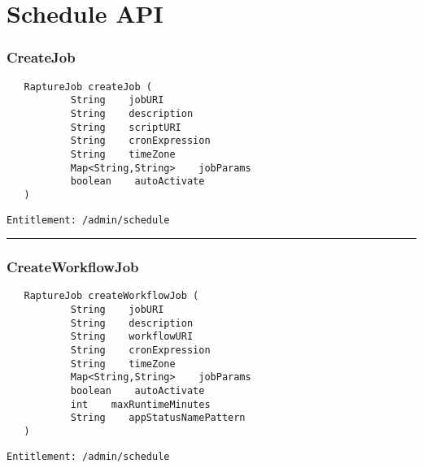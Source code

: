 \chapter{Schedule API}

\subsection{CreateJob}
\label{Api:CreateJob}
\begin{verbatim}
   RaptureJob createJob (
           String    jobURI
           String    description
           String    scriptURI
           String    cronExpression
           String    timeZone
           Map<String,String>    jobParams
           boolean    autoActivate
   )
\end{verbatim}
\begin{Verbatim}[fontsize=\small, formatcom=\color{Maroon}]
  Entitlement: /admin/schedule
\end{Verbatim}



\rule{12cm}{2pt}
\subsection{CreateWorkflowJob}
\label{Api:CreateWorkflowJob}
\begin{verbatim}
   RaptureJob createWorkflowJob (
           String    jobURI
           String    description
           String    workflowURI
           String    cronExpression
           String    timeZone
           Map<String,String>    jobParams
           boolean    autoActivate
           int    maxRuntimeMinutes
           String    appStatusNamePattern
   )
\end{verbatim}
\begin{Verbatim}[fontsize=\small, formatcom=\color{Maroon}]
  Entitlement: /admin/schedule
\end{Verbatim}



